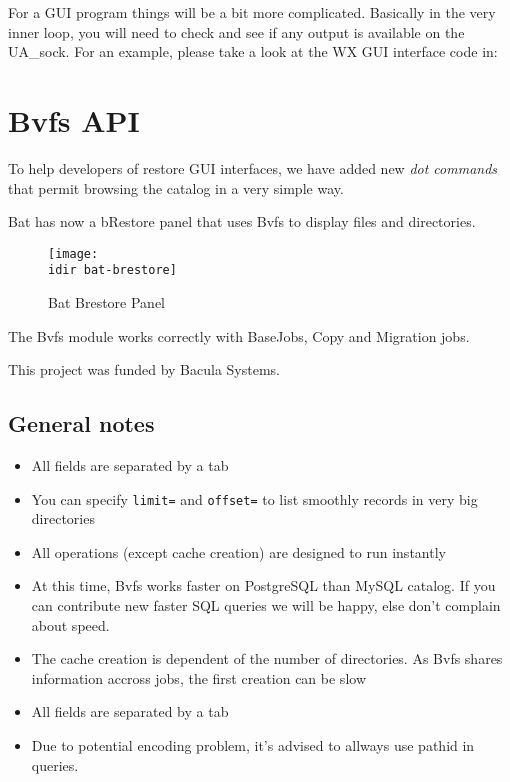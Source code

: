 For a GUI program things will be a bit more complicated. Basically in the very
inner loop, you will need to check and see if any output is available on the
UA\_sock. For an example, please take a look at the WX GUI interface code
in: 

\section{Bvfs API}
\label{sec:bvfs}

To help developers of restore GUI interfaces, we have added new \textsl{dot
  commands} that permit browsing the catalog in a very simple way.


Bat has now a bRestore panel that uses Bvfs to display files and
directories.

\begin{figure}[htbp]
  \centering
  \texttt{[image: \\idir bat-brestore]}
  \label{fig:batbrestore}
  \caption{Bat Brestore Panel}
\end{figure}

The Bvfs module works correctly with BaseJobs, Copy and Migration jobs.

\medskip
This project was funded by Bacula Systems.

\subsection*{General notes}

\begin{itemize}
\item All fields are separated by a tab
\item You can specify \texttt{limit=} and \texttt{offset=} to list smoothly
  records in very big directories
\item All operations (except cache creation) are designed to run instantly
\item At this time, Bvfs works faster on PostgreSQL than MySQL catalog. If you
  can contribute new faster SQL queries we will be happy, else don't complain
  about speed.
\item The cache creation is dependent of the number of directories. As Bvfs
  shares information accross jobs, the first creation can be slow
\item All fields are separated by a tab
\item Due to potential encoding problem, it's advised to allways use pathid in
  queries.
\end{itemize}

